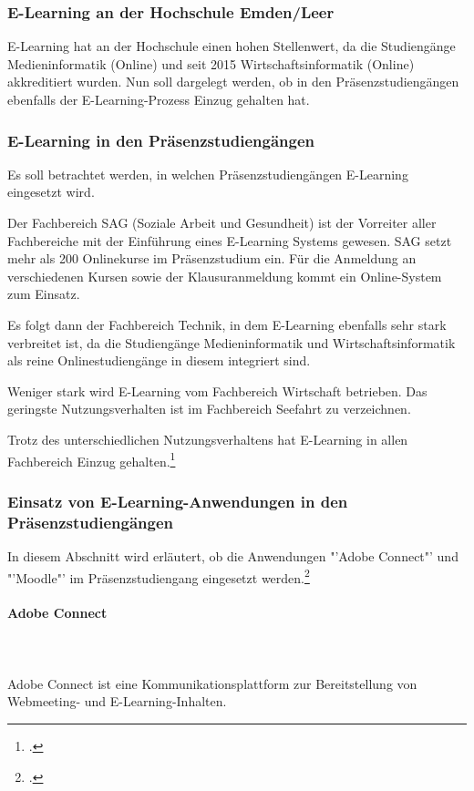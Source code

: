\subsubsection{E-Learning an der Hochschule Emden/Leer}
E-Learning hat an der Hochschule einen hohen Stellenwert, da die Studiengänge Medieninformatik (Online) und seit 2015 Wirtschaftsinformatik (Online) akkreditiert  wurden. Nun soll dargelegt werden, ob in den Präsenzstudiengängen ebenfalls der E-Learning-Prozess Einzug gehalten hat.

\subsubsection{E-Learning in den Präsenzstudiengängen}
Es soll betrachtet werden, in welchen Präsenzstudiengängen E-Learning eingesetzt wird.

Der Fachbereich SAG (Soziale Arbeit und Gesundheit) ist der Vorreiter aller Fachbereiche mit der Einführung eines E-Learning Systems gewesen. SAG setzt mehr als 200 Onlinekurse im Präsenzstudium ein. Für die Anmeldung an verschiedenen Kursen sowie der Klausuranmeldung kommt ein Online-System zum Einsatz.

Es folgt dann der Fachbereich Technik, in dem E-Learning ebenfalls sehr stark verbreitet ist, da die Studiengänge Medieninformatik und Wirtschaftsinformatik als reine Onlinestudiengänge in diesem integriert sind.

Weniger stark wird E-Learning vom Fachbereich Wirtschaft betrieben. Das geringste Nutzungsverhalten ist im Fachbereich Seefahrt zu verzeichnen.

Trotz des unterschiedlichen Nutzungsverhaltens hat E-Learning in allen Fachbereich Einzug gehalten.\footcite{gunter_muller_interview}

\subsubsection[Einsatz von E-Learning-Anwendungen]{Einsatz von E-Learning-Anwendungen in den Präsenzstudiengängen}
In diesem Abschnitt wird erläutert, ob die Anwendungen "'Adobe Connect"' und "'Moodle"' im Präsenzstudiengang eingesetzt werden.\footcite{gunter_muller_interview}

\paragraph{Adobe Connect}\mbox{} \\\\
Adobe Connect ist eine Kommunikationsplattform zur Bereitstellung von Webmeeting- und E-Learning-Inhalten.

